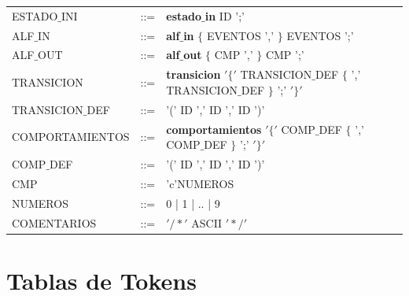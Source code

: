 \documentclass[12pt,a4paper]{article}
\begin{document}
{\begin{center}
\begin{tabular}{lcl}
				 ESTADO$\_$INI &::= & \textbf{estado$\_$in} ID ';'\\ 
				 
				ALF$\_$IN &::= & \textbf{alf$\_$in}  $\{$ EVENTOS ',' $\}$ EVENTOS ';' \\ 
				
				ALF$\_$OUT & ::= &\textbf{alf$\_$out}  $\{$ CMP ',' $\}$ CMP ';'  \\ 
				
				TRANSICION 	 & ::= & \textbf{transicion} $'\{'$ TRANSICION$\_$DEF $\{$ ',' TRANSICION$\_$DEF  $\}$ ';' $'\}'$ \\ 
				
				TRANSICION$\_$DEF & ::= & '(' ID ',' ID ',' ID ')' \\ 
			
				
				COMPORTAMIENTOS	 & ::= &  \textbf{comportamientos} $'\{'$ COMP$\_$DEF $\{$ ',' COMP$\_$DEF $\}$ ';' $'\}'$\\ 
				
				COMP$\_$DEF &  ::= & '(' ID ',' ID ',' ID ')' \\ 
				
				
				CMP  & ::= & 'c'NUMEROS \\ 
				
				NUMEROS &::= & 0 | 1 | .. | 9 \\ 
				
				COMENTARIOS & ::=  & $'/\ast'$ ASCII $'\ast/'$ \\
				
				
			\end{tabular} 	
		\end{center}
	
	
	\section{Tablas de Tokens}
		
}
\end{document}
